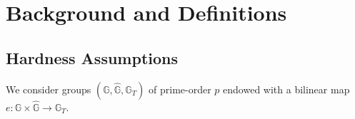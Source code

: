 \documentclass[10pt]{llncs}
\newcommand{\G}{\mathbb{G}}
\newcommand{\Z}{\mathbb{Z}}
\newcommand{\sample}{\stackrel{{\scriptscriptstyle \mkern4mu R}}{\gets}}
\begin{document}
  

\section{Background and Definitions} \label{background}

%

\subsection{Hardness Assumptions}
We consider groups $(\G,\hat{\G},\G_T)$ of prime-order $p$ endowed
with a bilinear map $e:\G \times \hat{\G} \to \G_T$. 

\begin{comment}
In this setting,
we rely on the standard Decision Linear assumption, which is a special case of the $K$-linear assumption (see Definition \ref{k-lin-def} in Appendix \ref{k-lin-ext}))
 for $K=2$.
  	
\begin{definition}[\cite{DBLP:conf/crypto/BonehBS04}] \label{DLIN-def} The \emph{Decision
    Linear Problem} (DLIN) in $\G$, is to distinguish the
  distributions $(g,g^{a},g^b,g^{ac},g^{bd},g^{c+d})$ and
  $(g,g^{a},g^b,g^{ac},g^{bd},g^{z})$, with $a,b,c,d \sample \Z_p$,
  $z\sample \Z_p $.  The Decision Linear assumption asserts the
  intractability of DLIN for any PPT distinguisher.
\end{definition}  
 
It will sometimes be convenient to use the following assumption, which
is weaker than DLIN. As noted in \cite{DBLP:conf/asiacrypt/CathaloLY09}, any algorithm solving
SDP immediately yields a DLIN distinguisher.
      
\begin{definition} \label{SDP-def} The \emph{Simultaneous Double
    Pairing problem} (SDP) in $(\G,\hat{\G}, \G_T)$ is, given a tuple of group
  elements $( \hat{g}_z, \hat{g}_r, \hat{h}_{z}, \hat{h}_{u}) \in
  \hat{\G}^4 $, to find a non-trivial triple $(z,r,u) \in \G^3
  \backslash \{(1_{\G},1_{\G},1_{\G})\}$ such that $e( z, \hat{g_z})
  \cdot e(r,\hat{g_{r}})=1_{\G_T}$ and $e(z,\hat{h}_z ) \cdot e(u,
  \hat{h}_{u})=1_{\G_T}$.
\end{definition}

\end{comment}
\end{document}
